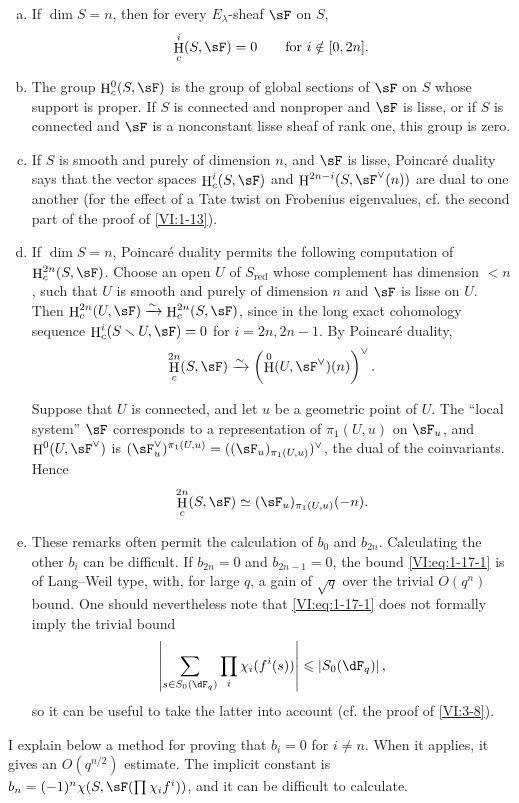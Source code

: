 \documentclass[12pt,oneside,english]{smfbook}
\DeclareMathOperator{\h}{H}
\newcommand{\iso}{\xrightarrow\sim}
\renewcommand{\setminus}{\smallsetminus}
\begin{document}
\begin{enumerate}[a)]
  \item If $\dim S=n$, then for every $E_\lambda$-sheaf $\sF$ on $S$,
    \[
      \h_c^i(S,\sF)=0 \qquad \text{for $i\notin[0,2n]$.}
    \]
  \item The group $\h_c^0(S,\sF)$ is the group of global sections of $\sF$ on $S$ whose support is proper. If $S$ is connected and nonproper and $\sF$ is lisse, or if $S$ is connected and $\sF$ is a nonconstant lisse sheaf of rank one, this group is zero.
  \item If $S$ is smooth and purely of dimension $n$, and $\sF$ is lisse, Poincaré duality says that the vector spaces $\h_c^i(S,\sF)$ and $\h^{2n-i}(S,\sF^\vee(n))$ are dual to one another (for the effect of a Tate twist on Frobenius eigenvalues, cf. the second part of the proof of \ref{VI:1-13}).
  \item If $\dim S=n$, Poincaré duality permits the following computation of $\h_c^{2n}(S,\sF)$. Choose an open $U$ of $S_\text{red}$ whose complement has dimension $<n$, such that $U$ is smooth and purely of dimension $n$ and $\sF$ is lisse on $U$. Then $\h_c^{2n}(U,\sF)\iso\h_c^{2n}(S,\sF)$, since in the long exact cohomology sequence $\h_c^i(S\setminus U,\sF)=0$ for $i=2n,2n-1$. By Poincaré duality,
    \[
      \h_c^{2n}(S,\sF)
      \iso\left(\h^0(U,\sF^\vee)(n)\right)^\vee \text{.}
    \]

    Suppose that $U$ is connected, and let $u$ be a geometric point of $U$. The ``local system'' $\sF$ corresponds to a representation of $\pi_1(U,u)$ on $\sF_u$, and $\h^0(U,\sF^\vee)$ is $(\sF_u^\vee)^{\pi_1(U,u)} =((\sF_u)_{\pi_1(U,u)})^\vee$, the dual of the coinvariants. Hence
    \[
      \h_c^{2n}(S,\sF)\simeq(\sF_u)_{\pi_1(U,u)}(-n) \text{.}
    \]
  \item These remarks often permit the calculation of $b_0$ and $b_{2n}$. Calculating the other $b_i$ can be difficult. If $b_{2n}=0$ and $b_{2n-1}=0$, the bound \eqref{VI:eq:1-17-1} is of Lang--Weil type, with, for large $q$, a gain of $\sqrt q$ over the trivial $O(q^n)$ bound. One should nevertheless note that \eqref{VI:eq:1-17-1} does not formally imply the trivial bound
    \[
      \left|\sum_{s\in S_0(\dF_q)} \prod_i \chi_i(f^i(s))\right| \leqslant \left| S_0(\dF_q)\right| \text{,}
    \]
    so it can be useful to take the latter into account (cf. the proof of \ref{VI:3-8}).
\end{enumerate}

I explain below a method for proving that $b_i=0$ for $i\ne n$. When it applies, it gives an $O(q^{n/2})$ estimate. The implicit constant is $b_n=(-1)^n\chi(S,\sF(\prod\chi_if^i))$, and it can be difficult to calculate.
\end{document}
